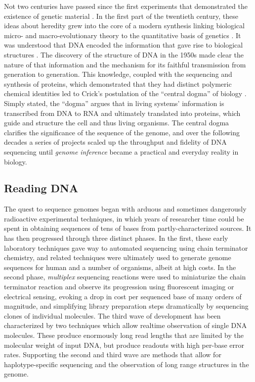 Not two centuries have passed since the first experiments that demonstrated the existence of genetic material \cite{mendel1866versuche}.
In the first part of the twentieth century, these ideas about heredity grew into the core of a modern synthesis linking biological micro- and macro-evolutionary theory to the quantitative basis of genetics \cite{huxley1942evolution}.
It was understood that DNA encoded the information that gave rise to biological structures \cite{avery1944studies}.
The discovery of the structure of DNA in the 1950s \cite{watson1953molecular} made clear the nature of that information and the mechanism for its faithful transmission from generation to generation.
This knowledge, coupled with the sequencing and synthesis of proteins, which demonstrated that they had distinct polymeric chemical identities \cite{sanger1951amino} led to Crick's postulation of the ``central dogma'' of biology \cite{crick1958protein}.
Simply stated, the ``dogma'' argues that in living systems' information is transcribed from DNA to RNA and ultimately translated into proteins, which guide and structure the cell and thus living organisms.
The central dogma clarifies the significance of the sequence of the genome, and over the following decades a series of projects scaled up the throughput and fidelity of DNA sequencing until \emph{genome inference} became a practical and everyday reality in biology.

\subsection{Reading DNA}

The quest to sequence genomes began with arduous and sometimes dangerously radioactive experimental techniques, in which years of researcher time could be spent in obtaining sequences of tens of bases from partly-characterized sources.
It has then progressed through three distinct phases.
In the first, these early laboratory techniques gave way to automated sequencing using chain terminator chemistry, and related techniques were ultimately used to generate genome sequences for human and a number of organisms, albeit at high costs.
In the second phase, \emph{multiplex} sequencing reactions were used to miniaturize the chain terminator reaction and observe its progression using fluorescent imaging or electrical sensing, evoking a drop in cost per sequenced base of many orders of magnitude, and simplifying library preparation steps dramatically by sequencing clones of individual molecules.
The third wave of development has been characterized by two techniques which allow realtime observation of single DNA molecules.
These produce enormously long read lengths that are limited by the molecular weight of input DNA, but produce readouts with high per-base error rates.
Supporting the second and third wave are methods that allow for haplotype-specific sequencing and the observation of long range structures in the genome.

